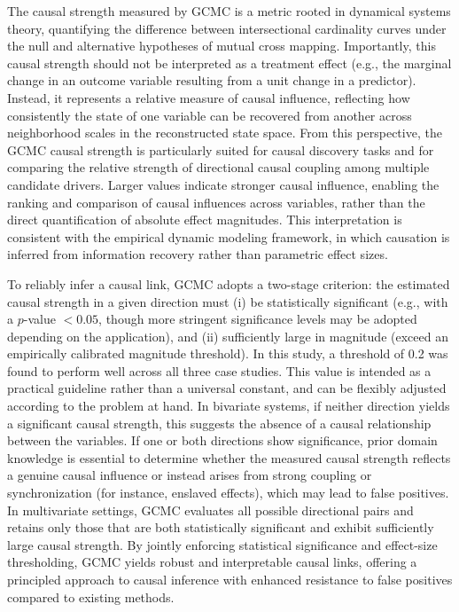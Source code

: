 \documentclass[authoryear,preprint,review,12pt]{elsarticle}
\begin{document}
The causal strength measured by GCMC is a metric rooted in dynamical systems theory, quantifying the difference between intersectional cardinality curves under the null and alternative hypotheses of mutual cross mapping. Importantly, this causal strength should not be interpreted as a treatment effect (e.g., the marginal change in an outcome variable resulting from a unit change in a predictor). Instead, it represents a relative measure of causal influence, reflecting how consistently the state of one variable can be recovered from another across neighborhood scales in the reconstructed state space. From this perspective, the GCMC causal strength is particularly suited for causal discovery tasks and for comparing the relative strength of directional causal coupling among multiple candidate drivers. Larger values indicate stronger causal influence, enabling the ranking and comparison of causal influences across variables, rather than the direct quantification of absolute effect magnitudes. This interpretation is consistent with the empirical dynamic modeling framework, in which causation is inferred from information recovery rather than parametric effect sizes.

To reliably infer a causal link, GCMC adopts a two-stage criterion: the estimated causal strength in a given direction must (i) be statistically significant (e.g., with a $p$-value $< 0.05$, though more stringent significance levels may be adopted depending on the application), and (ii) sufficiently large in magnitude (exceed an empirically calibrated magnitude threshold). In this study, a threshold of 0.2 was found to perform well across all three case studies. This value is intended as a practical guideline rather than a universal constant, and can be flexibly adjusted according to the problem at hand. In bivariate systems, if neither direction yields a significant causal strength, this suggests the absence of a causal relationship between the variables. If one or both directions show significance, prior domain knowledge is essential to determine whether the measured causal strength reflects a genuine causal influence or instead arises from strong coupling or synchronization (for instance, enslaved effects), which may lead to false positives. In multivariate settings, GCMC evaluates all possible directional pairs and retains only those that are both statistically significant and exhibit sufficiently large causal strength. By jointly enforcing statistical significance and effect-size thresholding, GCMC yields robust and interpretable causal links, offering a principled approach to causal inference with enhanced resistance to false positives compared to existing methods.
\end{document}
